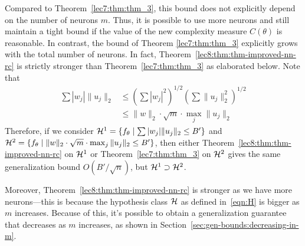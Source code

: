 \begin{remark}
	Compared to Theorem~\ref{lec7:thm:thm_3}, this bound does not explicitly depend on the number of neurons $m$. Thus, it is possible to use more neurons and still maintain a tight bound if the value of the new complexity measure $C(\theta)$ is reasonable. In contrast, the bound of Theorem \ref{lec7:thm:thm_3} explicitly grows with the total number of neurons. In fact, Theorem~\ref{lec8:thm:thm-improved-nn-rc} is strictly stronger than Theorem~\ref{lec7:thm:thm_3} as elaborated below. Note that 
	\begin{align}
		\sum |w_j|\|u_j\|_2 &\le \left(\sum |w_j|^2\right)^{1/2} \left(\sum\|u_j\|_2^2\right)^{1/2} \tag{by Cauchy-Schwarz inequality} \\
		& \le \|w\|_2 \cdot \sqrt{m} \cdot \max_{j}\|u_j\|_2
	\end{align}
	Therefore, if we consider $\mathcal H^1 = \{f_\theta \mid \sum |w_j|\|u_j\|_2\le B'\}$ and $\mathcal H^2 = \{f_\theta \mid \|w\|_2 \cdot \sqrt{m} \cdot \max_{j}\|u_j\|_2 \le B'\}$, then either Theorem~\ref{lec8:thm:thm-improved-nn-rc} on $\mathcal H^1$ or Theorem~\ref{lec7:thm:thm_3} on $\mathcal H^2$ gives the same generalization bound $O(B'/\sqrt{n})$, but $\mathcal H^1 \supset \mathcal H^2$. 
	
	Moreover, Theorem~\ref{lec8:thm:thm-improved-nn-rc} is stronger as we have more neurons---this is because the hypothesis class $\mathcal H$ as defined in~\eqref{eqn:H} is bigger as $m$ increases. Because of this, it's possible to obtain a generalization guarantee that decreases as $m$ increases, as shown in Section~\ref{sec:gen-bounds:decreasing-in-m}. 
	
\end{remark}

